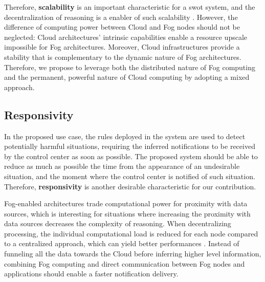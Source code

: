 \documentclass{iosart2c}
\newcommand{\Nicolas}[1]{\textcolor{red}{ Nicolas: \textbf{#1} }}
\begin{document}
Therefore, \textbf{scalability} is an important characteristic for a \gls{swot} system, and the decentralization of reasoning is a enabler of such scalability \cite{Maarala2017}.
However, the difference of computing power between Cloud and Fog nodes should not be neglected: Cloud architectures' intrinsic capabilities enable a resource upscale impossible for Fog architectures.
Moreover, Cloud infrastructures provide a stability that is complementary to the dynamic nature of Fog architectures.
Therefore, we propose to leverage both the distributed nature of Fog computing and the permanent, powerful nature of Cloud computing by adopting a mixed approach. 

\subsection{Responsivity}

In the proposed use case, the rules deployed in the system are used to detect potentially harmful situations, requiring the inferred notifications to be received by the control center as soon as possible. 
The proposed system should be able to reduce as much as possible the time from the appearance of an undesirable situation, and the moment where the control center is notified of such situation. 
Therefore, \textbf{responsivity} is another desirable characteristic for our contribution.

Fog-enabled architectures trade computational power for proximity with data sources, which is interesting for situations where increasing the proximity with data sources decreases the complexity of reasoning.
When decentralizing processing, the individual computational load is reduced for each node compared to a centralized approach, which can yield better performances \cite{Su2018}.
Instead of funneling all the data towards the Cloud before inferring higher level information, combining Fog computing and direct communication between Fog nodes and applications should enable a faster notification delivery.

%
%
%
\end{document}
